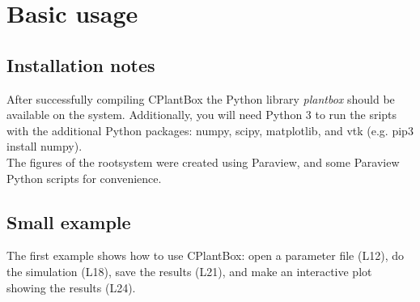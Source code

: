 \section{Basic usage} \label{sec:basic}

\subsection{Installation notes}

After successfully compiling CPlantBox the Python library \emph{plantbox} should be available on the system. %
Additionally, you will need Python 3 to run the sripts with the additional Python packages: numpy, scipy, matplotlib, and vtk (e.g. pip3 install numpy). \\

The figures of the rootsystem were created using Paraview, and some Paraview Python scripts for convenience. %

\subsection{Small example}

The first example shows how to use CPlantBox: open a parameter file (L12), do the simulation (L18), 
save the results (L21), and make an interactive plot showing the results (L24). 

 

